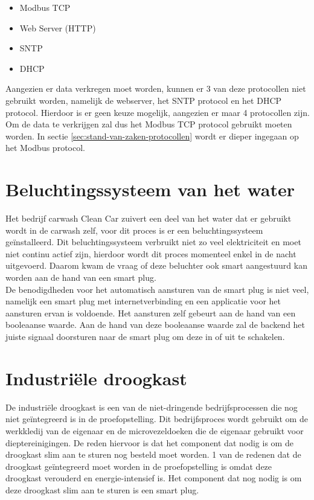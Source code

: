 \begin{itemize}
    \item Modbus TCP
    \item Web Server (HTTP)
    \item SNTP
    \item DHCP
\end{itemize}

Aangezien er data verkregen moet worden, kunnen er 3 van deze protocollen niet gebruikt worden, namelijk de webserver, het SNTP protocol en het DHCP protocol. Hierdoor is er geen keuze mogelijk, aangezien er maar 4 protocollen zijn. Om de data te verkrijgen zal dus het Modbus TCP protocol gebruikt moeten worden. In sectie \ref{sec:stand-van-zaken-protocollen} wordt er dieper ingegaan op het Modbus protocol.

\section{Beluchtingssysteem van het water}
\label{sec:stand-van-zaken-beluchtingssysteem}

Het bedrijf carwash Clean Car zuivert een deel van het water dat er gebruikt wordt in de carwash zelf, voor dit proces is er een beluchtingssysteem geïnstalleerd. Dit beluchtingssysteem verbruikt niet zo veel elektriciteit en moet niet continu actief zijn, hierdoor wordt dit proces momenteel enkel in de nacht uitgevoerd. Daarom kwam de vraag of deze beluchter ook smart aangestuurd kan worden aan de hand van een smart plug.\\

De benodigdheden voor het automatisch aansturen van de smart plug is niet veel, namelijk een smart plug met internetverbinding en een applicatie voor het aansturen ervan is voldoende. Het aansturen zelf gebeurt aan de hand van een booleaanse waarde. Aan de hand van deze booleaanse waarde zal de backend het juiste signaal doorsturen naar de smart plug om deze in of uit te schakelen.\\

\section{Industriële droogkast}
\label{sec:stand-van-zaken-droogkast}

De industriële droogkast is een van de niet-dringende bedrijfsprocessen die nog niet geïntegreerd is in de proefopstelling. Dit bedrijfsproces wordt gebruikt om de werkkledij van de eigenaar en de microvezeldoeken die de eigenaar gebruikt voor dieptereinigingen. De reden hiervoor is dat het component dat nodig is om de droogkast slim aan te sturen nog besteld moet worden. 1 van de redenen dat de droogkast geïntegreerd moet worden in de proefopstelling is omdat deze droogkast verouderd en energie-intensief is. Het component dat nog nodig is om deze droogkast slim aan te sturen is een smart plug.

